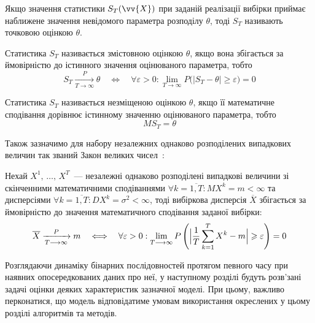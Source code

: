 Якщо значення статистики $S_T(\vv{X})$ при заданій реалізації вибірки приймає наближене значення невідомого параметра розподілу $\theta$, тоді $S_T$ називають точковою оцінкою $\theta$. 

\begin{definition}
    Статистика $S_T$ називається змістовною оцінкою $\theta$, якщо вона збігається за ймовірністю до істинного значення оцінюваного параметра, тобто 
    \begin{equation*}
        S_T \xrightarrow[T \longrightarrow \infty]{P} \theta \quad \Longleftrightarrow \quad \forall \varepsilon > 0 : \lim\limits_{T \longrightarrow \infty} P\bigl( |S_T - \theta| \geqslant \varepsilon \bigr) = 0
    \end{equation*}
\end{definition}

\begin{definition}
    Статистика $S_T$ називається незміщеною оцінкою $\theta$, якщо її математичне сподівання дорівнює істинному значенню оцінюваного параметра, тобто
    \begin{equation*}
        MS_T = \theta
    \end{equation*}
\end{definition}

Також зазначимо для набору незалежних однаково розподілених випадкових величин так званий Закон великих чисел~\cite{Larsen2017}:

\begin{theorem}
    Нехай $X^1,\,\ldots,\,X^T$~--- незалежні однаково розподілені випадкові величини зі скінченними математичними сподіваннями $\forall k=\overline{1,T} : MX^k=m<\infty$ та дисперсіями $\forall k=\overline{1,T} : DX^k=\sigma^2<\infty$, тоді вибіркова дисперсія $\overline{X}$ збігається за ймовірністю до значення математичного сподівання заданої вибірки:
    \begin{equation*}
        \overline{X} \xrightarrow[T \longrightarrow \infty]{P} m \quad \Longleftrightarrow \quad \forall \varepsilon > 0 : \lim\limits_{T \longrightarrow \infty} P\left( \Bigl| \frac{1}{T}\sum\limits_{k=1}^{T} X^k - m \Bigr| \geqslant \varepsilon \right) = 0
    \end{equation*}
\end{theorem}

\chapconclude{\ref{chap:review}}

Розглядаючи динаміку бінарних послідовностей протягом певного часу при наявних опосередкованих даних про неї, у наступному розділі будуть розв'зані задачі оцінки деяких характеристик зазначної моделі. При цьому, важливо перконатися, що модель відповідатиме умовам використання окреслених у цьому розділі алгоритмів та методів. 